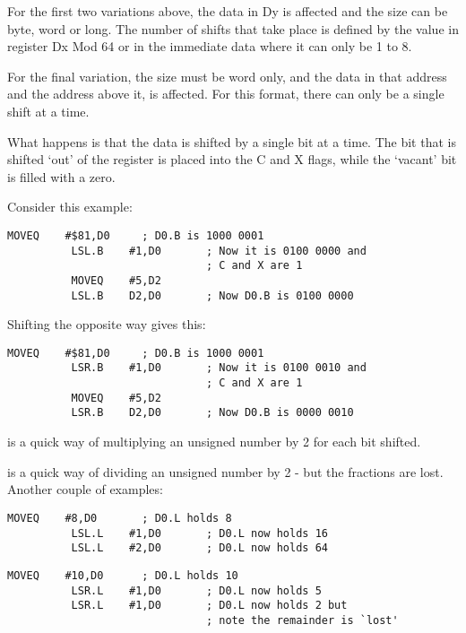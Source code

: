 For the first two variations above, the data in Dy is affected and
    the size can be byte, word or long. The number of shifts that take place
    is defined by the value in register Dx Mod 64 or in the immediate data 
    where it can only be 1 to 8.

For the final variation, the size must be word only, and the data in
    that address and the address above it, is affected. For this format, there
    can only be a single shift at a time.
    

What happens is that the data is shifted by a single bit at a time.
    The bit that is shifted `out' of the register is placed into the C and X
    flags, while the `vacant' bit is filled with a zero.

Consider this example:

\begin{lstlisting}[firstnumber=1,caption={LSL Example},label={lst:LslExample}]
          MOVEQ    #$81,D0     ; D0.B is 1000 0001
          LSL.B    #1,D0       ; Now it is 0100 0000 and 
                               ; C and X are 1
          MOVEQ    #5,D2
          LSL.B    D2,D0       ; Now D0.B is 0100 0000
\end{lstlisting}

Shifting the opposite way gives this:

\begin{lstlisting}[firstnumber=1,caption={LSR Example},label={lst:LsrExample}]
          MOVEQ    #$81,D0     ; D0.B is 1000 0001
          LSR.B    #1,D0       ; Now it is 0100 0010 and
                               ; C and X are 1
          MOVEQ    #5,D2
          LSR.B    D2,D0       ; Now D0.B is 0000 0010
\end{lstlisting}

 is a quick way of multiplying an unsigned number by 2 for each
    bit shifted.

 is a quick way of dividing an unsigned number by 2 -{} but the
    fractions are lost. Another couple of examples:

\begin{lstlisting}[firstnumber=1,caption={LSL Multiplication Example},label={lst:LsMultiplicationlExample}]
          MOVEQ    #8,D0       ; D0.L holds 8
          LSL.L    #1,D0       ; D0.L now holds 16
          LSL.L    #2,D0       ; D0.L now holds 64
\end{lstlisting}

\begin{lstlisting}[firstnumber=1,caption={LSR Division Example},label={lst:LsrDivisionExample}]
          MOVEQ    #10,D0      ; D0.L holds 10
          LSR.L    #1,D0       ; D0.L now holds 5
          LSR.L    #1,D0       ; D0.L now holds 2 but
                               ; note the remainder is `lost'
\end{lstlisting}

